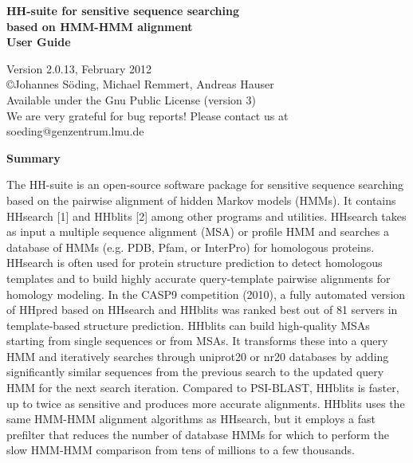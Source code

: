 \documentclass[11pt,a4paper]{article}
\begin{document}


\begin{center}

\vspace{20mm}
 
{\huge \bf HH-suite for sensitive sequence searching\\[2mm] based on HMM-HMM alignment}\\[4mm] 

{\Large \bf User Guide}

  Version 2.0.13, February 2012\\[2mm]
{\copyright  Johannes S\"oding, Michael Remmert, Andreas Hauser}\\[2mm]
Available under the Gnu Public License (version 3)\\[2mm]
We are very grateful for bug reports! Please contact us at soeding@genzentrum.lmu.de

{\bf \Large Summary}

\end{center}

\noindent The HH-suite is an open-source software package for sensitive sequence searching based on the pairwise alignment of hidden Markov models (HMMs). It contains HHsearch [1] and HHblits [2] among other programs and utilities. HHsearch takes as input a multiple sequence alignment (MSA) or profile HMM and searches a database of HMMs (e.g. PDB, Pfam, or InterPro) for homologous proteins. HHsearch is often used for protein structure prediction to detect homologous templates and to build highly accurate query-template pairwise alignments for homology modeling. In the CASP9 competition (2010), a fully automated version of HHpred based on HHsearch and HHblits was ranked best out of 81 servers in template-based structure prediction. HHblits can build high-quality MSAs starting from single sequences or from MSAs. It transforms these into a query HMM and iteratively searches through uniprot20 or nr20 databases by adding significantly similar sequences from the previous search to the updated query HMM for the next search iteration. Compared to PSI-BLAST, HHblits is faster, up to twice as sensitive and produces more accurate alignments. HHblits uses the same HMM-HMM alignment algorithms as HHsearch, but it employs a fast prefilter that reduces the number of database HMMs for which to perform the slow HMM-HMM comparison from tens of millions to a few thousands. \\[2mm]
\end{document}
